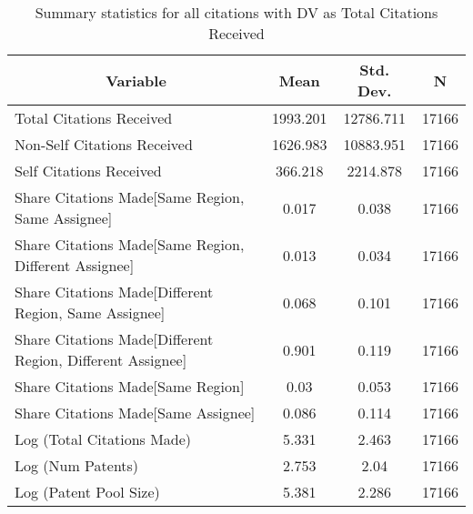 
\begin{table}[htbp]\centering \caption{Summary statistics for all citations with DV as Total Citations Received \label{a.e.o.t.n.tsummary}}
\scriptsize
\singlespacing
\begin{tabular}{l c c  c}\hline\hline
\multicolumn{1}{c}{\textbf{Variable}} & \textbf{Mean}
 & \textbf{Std. Dev.} & \textbf{N}\\ \hline
Total Citations Received & 1993.201 & 12786.711  & 17166\\
Non-Self Citations Received & 1626.983 & 10883.951  & 17166\\
Self Citations Received & 366.218 & 2214.878  & 17166\\
Share Citations Made[Same Region, Same Assignee] & 0.017 & 0.038  & 17166\\
Share Citations Made[Same Region, Different Assignee] & 0.013 & 0.034  & 17166\\
Share Citations Made[Different Region, Same Assignee] & 0.068 & 0.101  & 17166\\
Share Citations Made[Different Region, Different Assignee] & 0.901 & 0.119  & 17166\\
Share Citations Made[Same Region] & 0.03 & 0.053  & 17166\\
Share Citations Made[Same Assignee] & 0.086 & 0.114  & 17166\\
Log (Total Citations Made) & 5.331 & 2.463  & 17166\\
Log (Num Patents) & 2.753 & 2.04  & 17166\\
Log (Patent Pool Size) & 5.381 & 2.286  & 17166\\
\hline\end{tabular}
\end{table}
